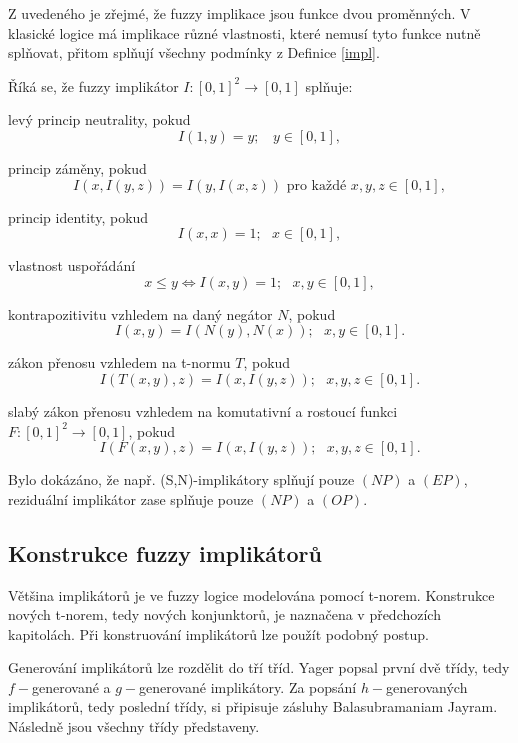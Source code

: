 Z uveden\'eho je z\v rejm\'e, \v ze fuzzy implikace jsou funkce dvou prom\v enn\'ych.
V klasick\'e logice m\'a implikace r\r uzn\'e vlastnosti, kter\'e nemus\'i tyto funkce nutn\v e spl\v novat, p\v ritom spl\v nuj\'i v\v sechny podm\'inky z Definice \ref{impl}.

\begin{definition}
\cite{Springer}
Říká se, že fuzzy implik\'ator $I:[0,1]^2 \rightarrow [0,1]$ spl\v nuje:
\begin{enumerate}
\item[(NP)] levý princip neutrality, pokud
$$I(1,y)=y; ~~~~y \in [0,1],$$
\item[(EP)] princip z\'aměny, pokud
$$I(x,I(y,z))=I(y,I(x,z)) \mbox{  pro ka\v zd\'e   } x,y,z \in [0,1],$$
\item[(IP)] princip identity, pokud
$$I(x,x) = 1; ~~~ x \in [0,1], $$
\item[(OP)] vlastnost uspořádání
$$x \leq y \iff I(x,y) =1; ~~~ x,y \in [0,1],$$
\item[(CP)] kontrapozitivitu vzhledem na dan\'y neg\'ator $N$, pokud
$$ I(x,y)=I(N(y),N(x)); ~~~ x,y \in [0,1].$$
 {\item[(LI)] z\'akon přenosu  vzhledem na  t-normu $T$, pokud
$$I(T(x, y), z) = I(x, I(y, z)); ~~~ x,y,z \in  [0, 1].$$
\item[(WLI)]  slab\'y z\'akon přenosu vzhledem na komutativní a
rostoucí funkci $F:
[0,1]^2 \to [0, 1]$, pokud
$$I(F(x, y), z) = I(x, I(y, z)); ~~~  x,y,z \in  [0, 1].$$}
\end{enumerate}
\end{definition}

\begin{remark}
    Bylo dok\'az\'ano, \v ze nap\v r. (S,N)-implikátory spl\v nují pouze $(NP)$ a $(EP)$, reziduální implikátor zase spl\v nuje pouze $(NP)$ a $(OP).$
\end{remark}

\subsection{Konstrukce fuzzy implikátor\r u}

Většina implikátor\r u je ve fuzzy logice modelována pomocí t-norem. Konstrukce nových t-norem, tedy nových konjunktor\r u, je naznačena v předchozích kapitolách. Při konstruování implikátor\r u lze použít podobný postup.

Generování implikátor\r u lze rozdělit do tří tříd. Yager popsal první dvě třídy, tedy $f-$generované a $g-$generované implikátory. Za popsání  $h-$generovaných implikátor\r u, tedy poslední třídy, si připisuje zásluhy Balasubramaniam Jayram. Následně jsou všechny třídy představeny.

